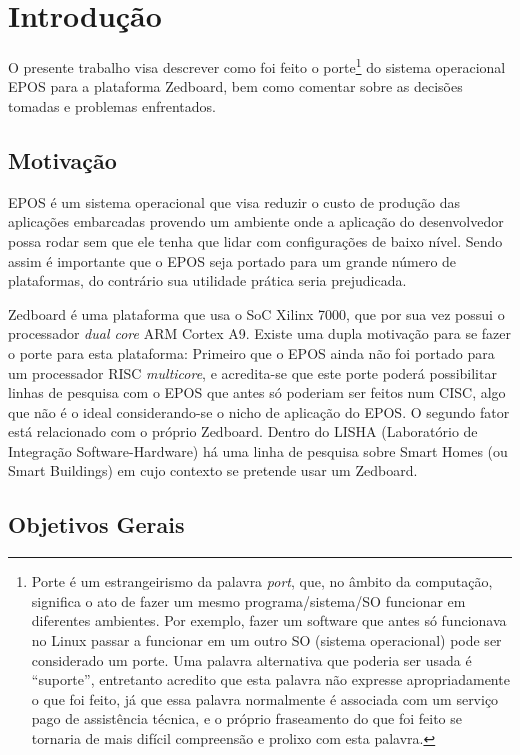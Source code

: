 \chapter{Introdução}

O presente trabalho visa descrever como foi feito o porte\footnote{Porte é um estrangeirismo da palavra \emph{port}, que, no âmbito da computação, significa o ato de fazer um mesmo programa/sistema/SO funcionar em diferentes ambientes. Por exemplo, fazer um software que antes só funcionava no Linux passar a funcionar em um outro SO (sistema operacional) pode ser considerado um porte. Uma palavra alternativa que poderia ser usada é ``suporte'', entretanto acredito que esta palavra não expresse apropriadamente o que foi feito, já que essa palavra normalmente é associada com um serviço pago de assistência técnica, e o próprio fraseamento do que foi feito se tornaria de mais difícil compreensão e prolixo com esta palavra.} do sistema operacional EPOS para a plataforma Zedboard, bem como comentar sobre as decisões tomadas e problemas enfrentados.

\section{Motivação}
EPOS é um sistema operacional que visa reduzir o custo de produção das aplicações embarcadas provendo um ambiente onde a aplicação do desenvolvedor possa rodar sem que ele tenha que lidar com configurações de baixo nível. Sendo assim é importante que o EPOS seja portado para um grande número de plataformas, do contrário sua utilidade prática seria prejudicada.

Zedboard é uma plataforma que usa o SoC Xilinx 7000, que por sua vez possui o processador \emph{dual core} ARM Cortex A9. Existe uma dupla motivação para se fazer o porte para esta plataforma: Primeiro que o EPOS ainda não foi portado para um processador RISC \emph{multicore}, e acredita-se que este porte poderá possibilitar linhas de pesquisa com o EPOS que antes só poderiam ser feitos num CISC, algo que não é o ideal considerando-se o nicho de aplicação do EPOS. O segundo fator está relacionado com o próprio Zedboard. Dentro do LISHA (Laboratório de Integração Software-Hardware) há uma linha de pesquisa sobre Smart Homes (ou Smart Buildings) em cujo contexto se pretende usar um Zedboard.

\section{Objetivos Gerais}

